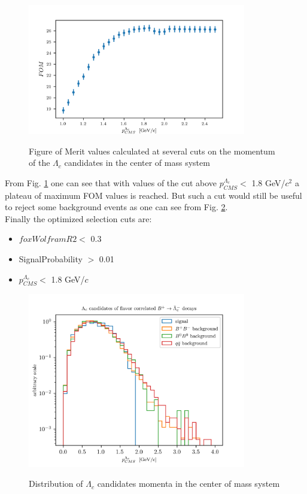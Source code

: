 \begin{figure}[H]
{\includegraphics[width=0.85\textwidth]{03-Selection/figs/corr_chargedB_FOMvsCMS_Pcut.png}}
\caption{Figure of Merit values calculated at several cuts on the momentum of the $\Lambda_c$ candidates in the center of mass system}
\label{fig:corr_chargedB_FOMvsCMS_Pcut}
\end{figure}
From Fig. \ref{fig:corr_chargedB_FOMvsCMS_Pcut} one can see that with values of the cut above $p^{\Lambda_c}_{CMS} <$ 1.8 GeV/$c^2$ a plateau of maximum FOM values is reached. But such a cut would still be useful to reject some background events as one can see from Fig. \ref{fig:LogPlotchargedBcorr_Lambda_c_CMS_P_optimisedSigProb_R}.  \\
Finally the optimized selection cuts are:

\begin{itemize}
    \item $foxWolframR2  < $  0.3
    \item SignalProbability $>$ 0.01
    \item $p^{\Lambda_c}_{CMS} <$ 1.8 GeV/$c$
\end{itemize}


\begin{figure}[H]
{\includegraphics[width=0.85\textwidth]{03-Selection/figs/LogPlotchargedBcorr_Lambda_c_CMS_P_optimisedSigProb_R.png}}
\caption{Distribution of  $\Lambda_c$ candidates momenta in the center of mass system}
\label{fig:LogPlotchargedBcorr_Lambda_c_CMS_P_optimisedSigProb_R}
\end{figure}

